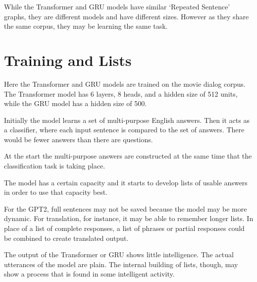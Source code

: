 While the Transformer and GRU models have similar `Repeated Sentence' graphs, they are different models and have different sizes. 
However as they share the same corpus, they may be learning the same task.

\section{Training and Lists}

Here the Transformer and GRU models are trained on the movie dialog corpus. The Transformer model has 6 layers, 8 heads, and a hidden size of 512 units, while the GRU model has a hidden size of 500.

Initially the model learns a set of multi-purpose English answers. %
Then it acts as a classifier, where each input sentence is compared to the set of answers. 
There would be fewer answers than there are questions. 

At the start the multi-purpose answers are constructed at the same time that the classification task is taking place. 

The model has a certain capacity and it starts to develop lists of usable answers in order to use that capacity best.

For the GPT2, full sentences may not be saved because the model may be more dynamic. For translation, for instance, it may be able to remember longer lists. In place of a list of complete responses, a list of phrases or partial responses could be combined to create translated output.

The output of the Transformer or GRU shows little intelligence. The actual utterances of the model are plain. The internal building of lists, though, may show a process that is found in some intelligent activity.